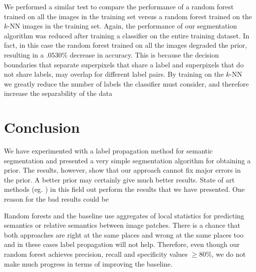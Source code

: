 \documentclass{article} %
\begin{document}
We performed a similar test to compare the performance of a random forest trained on all the images in the training set versus a random forest trained on the $k$-NN images in the training set. Again, the performance of our segmentation algorithm was reduced after training a classifier on the entire training dataset. In fact, in this case the random forest trained on all the images degraded the prior, resulting in a $.0530 \%$ decrease in accuracy. This is because the decision boundaries that separate superpixels that share a label and superpixels that do not share labels, may overlap for different label pairs. By training on the $k$-NN we greatly reduce the number of labels the classifier must consider, and therefore increase the separability of the data

\section{Conclusion}
\label{sec:Conclusion}
We have experimented with a label propagation method for semantic segmentation and presented a very simple segmentation algorithm for obtaining a prior. The results, however, show that our approach cannot fix major errors in the prior. A better prior may certainly give much better results. State of art methods (eg. \cite{urtasun}) in this field out perform the results that we have presented. One reason for the bad results could be

Random forests and the baseline use aggregates of local statistics for predicting semantics or relative semantics between image patches. There is a chance that both approaches are right at the same places and wrong at the same places too and in these cases label propagation will not help. Therefore, even though our random forest achieves precision, recall and specificity values $\ge 80\%$, we do not make much progress in terms of improving the baseline.





\end{document}
